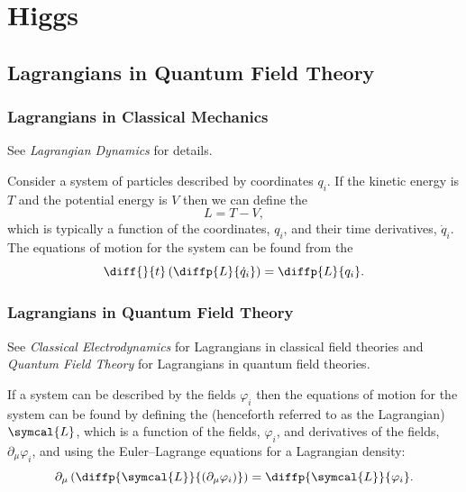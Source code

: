 \documentclass[fleqn]{NotesClass}
\newcommand{\course}[1]{\textit{#1}}
\newcommand{\lagrangianDensity}{\symcal{L}}
\newcommand{\lagrangian}{L}
\begin{document}
    \chapter{Higgs}
    \section{Lagrangians in Quantum Field Theory}
    \subsection{Lagrangians in Classical Mechanics}
    \begin{rmk}
        See \course{Lagrangian Dynamics} for details.
    \end{rmk}
    Consider a system of particles described by coordinates \(q_i\).
    If the kinetic energy is \(T\) and the potential energy is \(V\) then we can define the 
    \begin{equation}
        \lagrangian = T - V,
    \end{equation}
    which is typically a function of the coordinates, \(q_i\), and their time derivatives, \(\dot{q}_i\).
    The equations of motion for the system can be found from the 
    \begin{equation}
        \diff{}{t}\left( \diffp{\lagrangian}{\dot{q}_i} \right) = \diffp{\lagrangian}{q_i}.
    \end{equation}
    
    \subsection{Lagrangians in Quantum Field Theory}
    \begin{rmk}
        See \course{Classical Electrodynamics} for Lagrangians in classical field theories and \course{Quantum Field Theory} for Lagrangians in quantum field theories.
    \end{rmk}
    
    If a system can be described by the fields \(\varphi_i\) then the equations of motion for the system can be found by defining the  (henceforth referred to as the Lagrangian) \(\lagrangianDensity\), which is a function of the fields, \(\varphi_i\), and derivatives of the fields, \(\partial_\mu \varphi_i\), and using the Euler--Lagrange equations for a Lagrangian density:
    \begin{equation}
        \partial_\mu \left( \diffp{\lagrangianDensity}{(\partial_\mu \varphi_i)} \right) = \diffp{\lagrangianDensity}{\varphi_i}.
    \end{equation}
    
\end{document}
